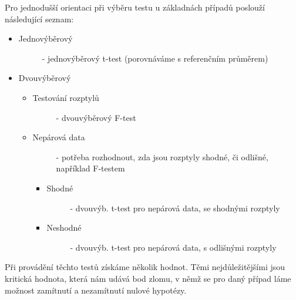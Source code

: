 \documentclass[thesis=M,czech]{FITthesis}[2022/10/08]
\begin{document}
Pro jednodušší orientaci při výběru testu u základnách případů poslouží následující seznam: \cite{kapustova}
\begin{itemize}
    \item  \begin{description}
            \item[Jednovýběrový] - jednovýběrový t-test (porovnáváme s referenčním průměrem)
        \end{description}
    \item \begin{description}
            \item[Dvouvýběrový] 
        \end{description} 
        \begin{itemize}
            \item \begin{description}
                    \item[Testování rozptylů] - dvouvýběrový F-test
                \end{description}
                \item \begin{description}
                    \item[Nepárová data] - potřeba rozhodnout, zda jsou rozptyly shodné, či odlišné, například F-testem
                \end{description}
                \begin{itemize}
                    \item \begin{description}
                        \item[Shodné] - dvouvýb. t-test pro nepárová data, se shodnými rozptyly
                    \end{description}
                    \item \begin{description}
                        \item[Neshodné] -  dvouvýb. t-test pro nepárová data, s odlišnými rozptyly
                    \end{description}
                
        \end{itemize}
        \end{itemize}
\end{itemize}

Při provádění těchto testů získáme několik hodnot. Těmi nejdůležitějšími jsou kritická hodnota, která nám udává bod zlomu, v němž se pro daný případ láme možnost zamítnutí a nezamítnutí nulové hypotézy.
\end{document}

